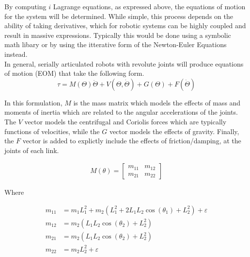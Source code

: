 \documentclass[journal]{IEEEtran}
\begin{document}
By computing $i$ Lagrange equations, as expressed above, the equations of motion for the system will be determined. While simple, this process depends on the ability of taking derivatives, which for robotic systems can be highly coupled and result in massive expressions. Typically this would be done using a symbolic math libary or by using the itterative form of the Newton-Euler Equations instead.\\

In general, serially articulated robots with revolute joints will produce equations of motion (EOM) that take the following form.
\begin{equation}\label{eq:robot_dyn}
  \tau = M(\Theta)\ddot{\Theta} + V(\Theta, \dot{\Theta}) + G(\Theta) + F(\dot{\Theta})
\end{equation}


In this formulation, $M$ is the mass matrix which models the effects of mass and moments of inertia which are related to the angular accelerations of the joints. The $V$ vector models the centrifugal and Coriolis forces which are typically functions of velocities, while the $G$ vector models the effects of gravity. Finally, the $F$ vector is added to explictly include the effects of friction/damping, at the joints of each link.

\begin{equation}
\begin{aligned}
M(\theta)=\left[\begin{array}{ll}
 m_{11} & m_{12}  \\
 m_{21} & m_{22} \end{array}\right]
\end{aligned}
\end{equation}

Where

\begin{equation*}
\begin{aligned}
  m_{11} & = m_{1} L_{1}^{2}+m_{2}\left(L_{1}^{2}+2 L_{1} L_{2} \cos \left(\theta_{1}\right)+L_{2}^{2}\right) + \varepsilon \\
  m_{12} & = m_{2}\left(L_{1} L_{2} \cos \left(\theta_{2}\right)+L_{2}^{2}\right) \\
  m_{21} & = m_{2}\left(L_{1} L_{2} \cos \left(\theta_{2}\right)+L_{2}^{2}\right)\\
  m_{22} & = m_{2} L_{2}^{2}+\varepsilon
\end{aligned}
\end{equation*}
\end{document}
